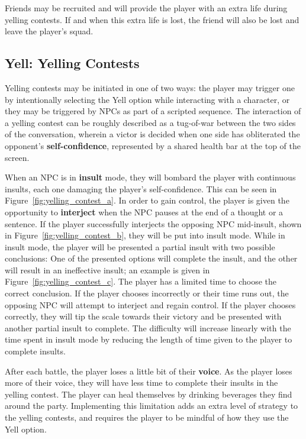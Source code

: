 Friends may be recruited and will provide the player with an extra life during yelling contests. If and when this extra life is lost, the friend will also be lost and leave the player's squad.


\subsection{Yell: Yelling Contests}
\label{sec:yelling_contest}

Yelling contests may be initiated in one of two ways: the player may trigger one by intentionally selecting the Yell option while interacting with a character, or they may be triggered by NPCs as part of a scripted sequence. The interaction of a yelling contest can be roughly described as a tug-of-war between the two sides of the conversation, wherein a victor is decided when one side has obliterated the opponent's \textbf{self-confidence}, represented by a shared health bar at the top of the screen.

When an NPC is in \textbf{insult} mode, they will bombard the player with continuous insults, each one damaging the player's self-confidence. This can be seen in Figure~\ref{fig:yelling_contest_a}. In order to gain control, the player is given the opportunity to \textbf{interject} when the NPC pauses at the end of a thought or a sentence. If the player successfully interjects the opposing NPC mid-insult, shown in Figure~\ref{fig:yelling_contest_b}, they will be put into insult mode. While in insult mode, the player will be presented a partial insult with two possible conclusions: One of the presented options will complete the insult, and the other will result in an ineffective insult; an example is given in Figure~\ref{fig:yelling_contest_c}. The player has a limited time to choose the correct conclusion. If the player chooses incorrectly or their time runs out, the opposing NPC will attempt to interject and regain control. If the player chooses correctly, they will tip the scale towards their victory and be presented with another partial insult to complete. The difficulty will increase linearly with the time spent in insult mode by reducing the length of time given to the player to complete insults.

After each battle, the player loses a little bit of their \textbf{voice}. As the player loses more of their voice, they will have less time to complete their insults in the yelling contest. The player can heal themselves by drinking beverages they find around the party. Implementing this limitation adds an extra level of strategy to the yelling contests, and requires the player to be mindful of how they use the Yell option.

